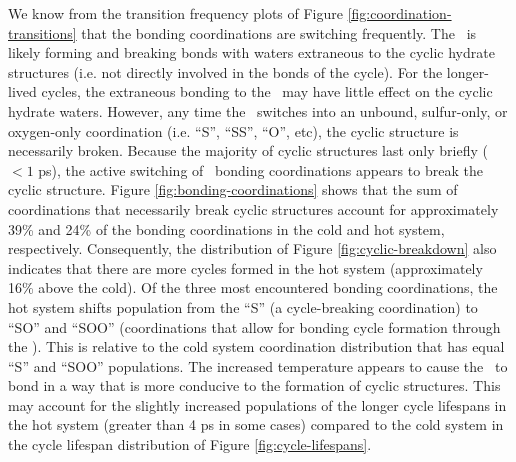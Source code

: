 We know from the transition frequency plots of Figure \ref{fig:coordination-transitions} that the bonding coordinations are switching frequently. The \suldiox~is likely forming and breaking bonds with waters extraneous to the cyclic hydrate structures (i.e. not directly involved in the bonds of the cycle). For the longer-lived cycles, the extraneous bonding to the \suldiox~may have little effect on the cyclic hydrate waters. However, any time the \suldiox~switches into an unbound, sulfur-only, or oxygen-only coordination (i.e. ``S'', ``SS'', ``O'', etc), the cyclic structure is necessarily broken. Because the majority of cyclic structures last only briefly ($<1$ ps), the active switching of \suldiox~bonding coordinations appears to break the cyclic structure. Figure \ref{fig:bonding-coordinations} shows that the sum of coordinations that necessarily break cyclic structures account for approximately 39\% and 24\% of the bonding coordinations in the cold and hot system, respectively. Consequently, the distribution of Figure \ref{fig:cyclic-breakdown} also indicates that there are more cycles formed in the hot system (approximately 16\% above the cold). Of the three most encountered bonding coordinations, the hot system shifts population from the ``S'' (a cycle-breaking coordination) to ``SO'' and ``SOO'' (coordinations that allow for bonding cycle formation through the \suldiox). This is relative to the cold system coordination distribution that has equal ``S'' and ``SOO'' populations. The increased temperature appears to cause the \suldiox~to bond in a way that is more conducive to the formation of cyclic structures. This may account for the slightly increased populations of the longer cycle lifespans in the hot system (greater than 4 ps in some cases) compared to the cold system in the cycle lifespan distribution of Figure \ref{fig:cycle-lifespans}. 

